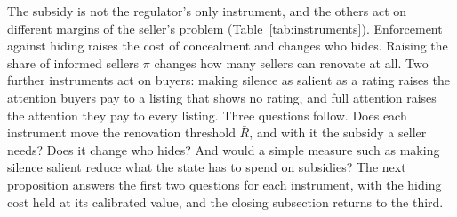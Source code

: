 The subsidy is not the regulator's only instrument, and the others act on different margins of the seller's problem (Table~\ref{tab:instruments}). Enforcement against hiding raises the cost of concealment and changes who hides. Raising the share of informed sellers $\pi$ changes how many sellers can renovate at all. Two further instruments act on buyers: making silence as salient as a rating raises the attention buyers pay to a listing that shows no rating, and full attention raises the attention they pay to every listing. Three questions follow. Does each instrument move the renovation threshold $\bar R$, and with it the subsidy a seller needs? Does it change who hides? And would a simple measure such as making silence salient reduce what the state has to spend on subsidies? The next proposition answers the first two questions for each instrument, with the hiding cost held at its calibrated value, and the closing subsection returns to the third.
